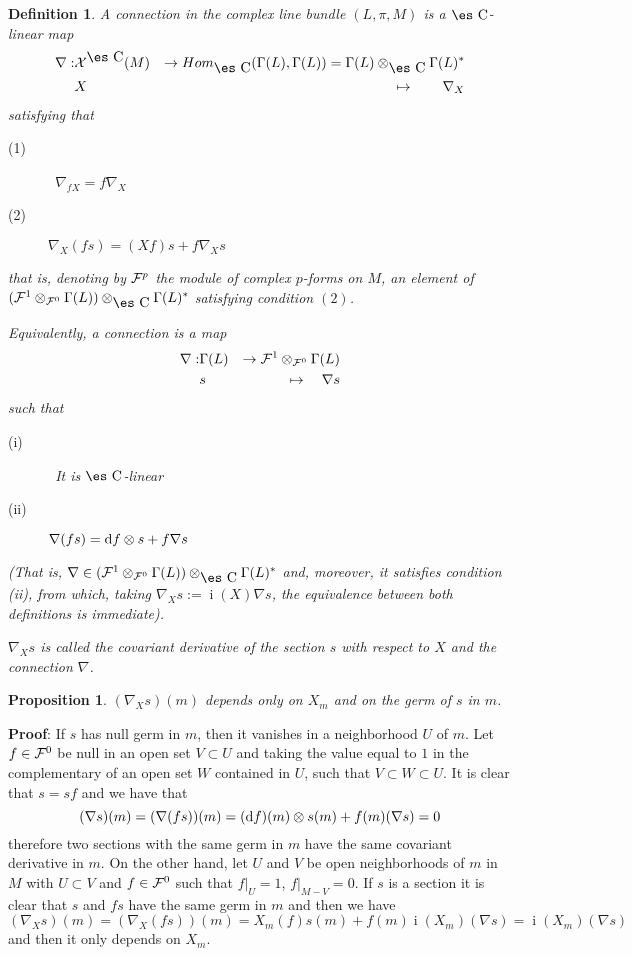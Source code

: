 \documentclass[12pt]{article}
\newtheorem{prop}{Proposition}
\newtheorem{definition}{Definition}
\def\beann{\begin{eqnarray*}}
\def\eeann{\end{eqnarray*}}
\def\qed{\ifvmode\removelastskip\fi
{\unskip\nobreak\hfil\penalty50\hbox{}\nobreak\hfil
\hbox{\vrule height1.2ex width1.2ex}\parfillskip=0pt
\finalhyphendemerits=0 \par\smallskip}}
\def\d{{\rm d}}
\def\Complex{\mbox{\es C}}
\def\inn{\mathop{i}\nolimits}
\begin{document}
\begin{definition}
A {\rm connection} in the complex line bundle
$(L,\pi ,M)$ is a $\Complex$-linear map
\beann
\nabla : & {\cal X}^{\Complex}(M) & \to
Hom_{\Complex}(\Gamma (L),\Gamma (L)) =
\Gamma (L) \otimes_{\Complex} \Gamma (L)^*
\\
& X & \mapsto \quad \quad \nabla_X
\eeann
satisfying that
\begin{description}
\item[{\rm (1)}] \
$\nabla_{fX} = f\nabla_X$
\item[{\rm (2)}]
$\nabla_X(fs) = (Xf)s + f\nabla_Xs$
\end{description}
that is, denoting by ${\cal F}^p$ the module of complex $p$-forms on
$M$,
an element of
$({\cal F}^1 \otimes_{{\cal F}^0} \Gamma (L))\otimes_{\Complex}\Gamma
(L)^*$
satisfying condition $(2)$.

Equivalently, a connection is a map
\beann
\nabla : & \Gamma(L) & \to
{\cal F}^1 \otimes_{{\cal F}^0} \Gamma (L)
\\
& s & \mapsto \quad \nabla s
\eeann
such that
\begin{description}
\item[{\rm (i)}] \
It is $\Complex$-linear
\item[{\rm (ii)}]
$\nabla (fs) = \d f \otimes s + f\nabla s$
\end{description}
(That is,
$\nabla \in ({\cal F}^1 \otimes_{{\cal F}^0} \Gamma (L))
\otimes_{\Complex} \Gamma (L)^*$
and, moreover, it satisfies condition (ii),
from which, taking
$\nabla_X s := \inn(X) \nabla s$,
the equivalence between both definitions
is immediate).

$\nabla_Xs$ is called the
{\rm covariant derivative}
of the section $s$ with respect to $X$
and the connection $\nabla$.
\label{nabla}
\end{definition}

\begin{prop}
$(\nabla_Xs)(m)$ depends only on $X_m$ and on the germ of $s$ in $m$.
\label{depen}
\end{prop}
{\bf Proof}:  If $s$ has null germ in $m$, then it vanishes
in a neighborhood $U$ of $m$. Let $f \in {\cal F}^0$ be null in an
open set $V \subset U$ and taking the value equal to $1$ in the
complementary of an open set $W$ contained in $U$, such that $V
\subset W \subset U$. It is clear that $s = sf$ and we have that
$$ (\nabla s)(m) = (\nabla (fs))(m) = (\d f)(m) \otimes s(m) +
f(m)(\nabla s) = 0 $$ therefore two sections with the same germ in
$m$ have the same covariant derivative in $m$. On the other hand,
let $U$ and $V$ be open neighborhoods of $m$ in $M$ with $U
\subset V$ and $f \in {\cal F}^0$ such that $f \vert_U = 1$, $f
\vert_{M-V} = 0$. If $s$ is a section it is clear that $s$ and
$fs$ have the same germ in $m$ and then we have $$ (\nabla_X s)(m)
= (\nabla_X (fs))(m) = X_m(f)s(m) + f(m)\inn(X_m)(\nabla s)
=\inn(X_m)(\nabla s) $$ and then it only depends on $X_m$. \qed
\end{document}
